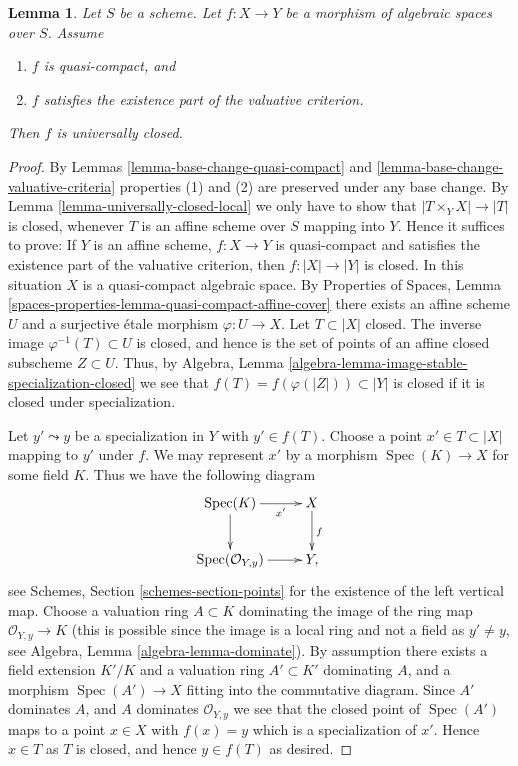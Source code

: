 \documentclass[10pt,a4paper]{amsart}
\theoremstyle{plain}
\newtheorem{lemma}[subsection]{Lemma}
\theoremstyle{definition}
\theoremstyle{remark}
\numberwithin{equation}{subsection}
\def\Spec{\mathop{\mathrm{Spec}}}
\begin{document}
\begin{lemma}
\label{lemma-quasi-compact-existence-universally-closed}
Let $S$ be a scheme.
Let $f : X \to Y$ be a morphism of algebraic spaces over $S$.
Assume
\begin{enumerate}
\item $f$ is quasi-compact, and
\item $f$ satisfies the existence part of the valuative criterion.
\end{enumerate}
Then $f$ is universally closed.
\end{lemma}

\begin{proof}
By Lemmas \ref{lemma-base-change-quasi-compact}
and \ref{lemma-base-change-valuative-criteria}
properties (1) and (2) are preserved under
any base change. By Lemma \ref{lemma-universally-closed-local}
we only have to show that $|T \times_Y X| \to |T|$ is closed,
whenever $T$ is an affine scheme over $S$ mapping into $Y$. Hence it
suffices to prove: If $Y$ is an affine scheme, $f : X \to Y$ is quasi-compact
and satisfies the existence part of the valuative criterion, then
$f : |X| \to |Y|$ is closed. In this situation $X$ is a quasi-compact
algebraic space. By
Properties of Spaces,
Lemma \ref{spaces-properties-lemma-quasi-compact-affine-cover}
there exists an affine scheme $U$ and a surjective \'etale morphism
$\varphi : U \to X$. Let $T \subset |X|$ closed. The inverse image
$\varphi^{-1}(T) \subset U$ is closed, and hence is the set of points
of an affine closed subscheme $Z \subset U$. Thus, by
Algebra, Lemma \ref{algebra-lemma-image-stable-specialization-closed}
we see that $f(T) = f(\varphi(|Z|)) \subset |Y|$ is closed if it is
closed under specialization.

\medskip\noindent
Let $y' \leadsto y$ be a specialization in $Y$ with $y' \in f(T)$.
Choose a point $x' \in T \subset |X|$ mapping to $y'$ under $f$.
We may represent $x'$ by a morphism $\Spec(K) \to X$
for some field $K$. Thus we have the following diagram
$$
\xymatrix{
\Spec(K) \ar[r]_-{x'} \ar[d] & X \ar[d]^f \\
\Spec(\mathcal{O}_{Y, y}) \ar[r] & Y,
}
$$
see
Schemes, Section \ref{schemes-section-points}
for the existence of the left vertical map.
Choose a valuation ring $A \subset K$ dominating the image of
the ring map $\mathcal{O}_{Y, y} \to K$ (this is possible since
the image is a local ring and not a field as $y' \not = y$, see
Algebra, Lemma \ref{algebra-lemma-dominate}).
By assumption there exists a field extension $K'/K$ and a
valuation ring $A' \subset K'$ dominating $A$, and a morphism
$\Spec(A') \to X$ fitting into the commutative diagram.
Since $A'$ dominates $A$, and $A$ dominates $\mathcal{O}_{Y, y}$
we see that the closed point of $\Spec(A')$ maps to
a point $x \in X$ with $f(x) = y$ which is a specialization of $x'$.
Hence $x \in T$ as $T$ is closed, and hence $y \in f(T)$ as desired.
\end{proof}
\end{document}
